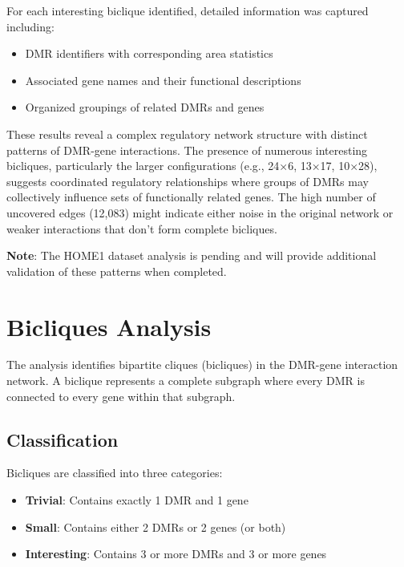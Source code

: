 \documentclass{article}
\begin{document}
For each interesting biclique identified, detailed information was captured including:
\begin{itemize}
    \item DMR identifiers with corresponding area statistics
    \item Associated gene names and their functional descriptions
    \item Organized groupings of related DMRs and genes
\end{itemize}

These results reveal a complex regulatory network structure with distinct patterns of DMR-gene interactions. The presence of numerous interesting bicliques, particularly the larger configurations (e.g., 24×6, 13×17, 10×28), suggests coordinated regulatory relationships where groups of DMRs may collectively influence sets of functionally related genes. The high number of uncovered edges (12,083) might indicate either noise in the original network or weaker interactions that don't form complete bicliques.

\textbf{Note}: The HOME1 dataset analysis is pending and will provide additional validation of these patterns when completed.

\section{Bicliques Analysis}
The analysis identifies bipartite cliques (bicliques) in the DMR-gene interaction network. A biclique represents a complete subgraph where every DMR is connected to every gene within that subgraph.

\subsection{Classification}
Bicliques are classified into three categories:
\begin{itemize}
    \item \textbf{Trivial}: Contains exactly 1 DMR and 1 gene
    \item \textbf{Small}: Contains either 2 DMRs or 2 genes (or both)
    \item \textbf{Interesting}: Contains 3 or more DMRs and 3 or more genes
\end{itemize}
\end{document}
